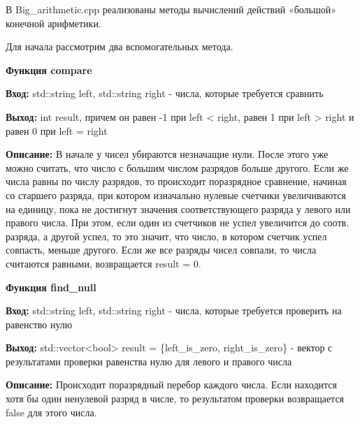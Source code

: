 \newpage

 \par
В Big\_arithmetic.cpp реализованы методы вычислений действий «большой» конечной арифметики. \par
Для начала рассмотрим два вспомогательных метода. 
\vspace{8pt}

\textbf{Функция compare } \par
\textbf{Вход:} std::string left, std::string right - числа, которые требуется сравнить\par
\textbf{Выход:} int result, причем он равен -1 при left < right, равен 1 при left > right и равен 0 при left = right\par
\textbf{Описание:} В начале у чисел убираются незначащие нули. После этого уже можно считать, что число с большим числом разрядов больше другого. Если же числа равны по числу разрядов, то происходит поразрядное сравнение, начиная со старшего разряда, при котором изначально нулевые счетчики увеличиваются на единицу, пока не достигнут значения соответствующего разряда у левого или правого числа. При этом, если один из счетчиков не успел увеличится до соотв. разряда, а другой успел, то это значит, что число, в котором счетчик успел совпасть, меньше другого. Если же все разряды чисел совпали, то числа считаются равными, возвращается result = 0. \par
\vspace{10pt}

\textbf{Функция find\_null } \par
\textbf{Вход:} std::string left, std::string right - числа, которые требуется проверить на равенство нулю \par
\textbf{Выход:} std::vector<bool> result = \{left\_is\_zero, right\_is\_zero\} - вектор с результатами проверки равенства нулю для левого и правого числа\par
\textbf{Описание:} Происходит поразрядный перебор каждого числа. Если находится хотя бы один ненулевой разряд в числе, то результатом проверки возвращается false для этого числа. \par
\vspace{10pt}

